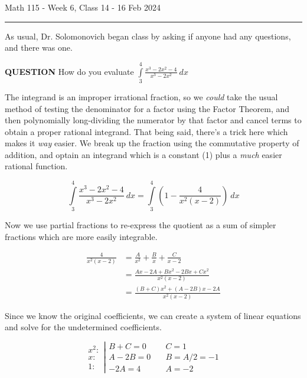 \documentclass{article}
\begin{document}
Math 115 - Week 6, Class 14 - 16 Feb 2024
\hrule

\vspace{10pt}

As usual, Dr. Solomonovich began class by asking if anyone had any questions, and there was one.

\vspace{10pt}

{\bf{}QUESTION} How do you evaluate $\displaystyle\int\limits_3^4\frac{x^3-2x^2-4}{x^3-2x^2}\ dx$

\vspace{10pt}

The integrand is an improper irrational fraction, so we \textit{could} take the usual method of testing the denominator for a factor using the Factor Theorem, and then polynomially long-dividing the numerator by that factor and cancel terms to obtain a proper rational integrand. That being said, there's a trick here which makes it \textit{way} easier. We break up the fraction using the commutative property of addition, and optain an integrand which is a constant (1) plus a \textit{much} easier rational function.

\[\int\limits_3^4\frac{x^3-2x^2-4}{x^3-2x^2}\ dx=\int\limits_3^4\left(1-\frac{4}{x^2(x-2)}\right)\ dx\]

\vspace{10pt}

Now we use partial fractions to re-express the quotient as a sum of simpler fractions which are more easily integrable.

\begin{align*}
\frac{4}{x^2(x-2)}&=\frac{A}{x^2}+\frac{B}{x}+\frac{C}{x-2}\\
&=\frac{Ax-2A+Bx^2-2Bx+Cx^2}{x^2(x-2)}\\
&=\frac{(B+C)x^2+(A-2B)x-2A}{x^2(x-2)}
\end{align*}

\vspace{10pt}

Since we know the original coefficients, we can create a system of linear equations and solve for the undetermined coefficients.

\[\begin{aligned}x^2:\\x:\\1:\end{aligned}\left|\begin{aligned}B+C=0&\quad C=1\\A-2B=0&\quad B=A/2=-1\\-2A=4&\quad A=-2\end{aligned}\right.\]
\end{document}
